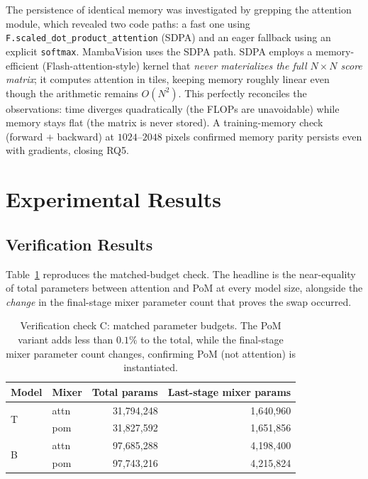\documentclass[11pt,a4paper]{article}
\begin{document}
The persistence of identical memory was investigated by grepping the attention module, which revealed two code paths: a fast one using \texttt{F.scaled\_dot\_product\_attention} (SDPA) and an eager fallback using an explicit \texttt{softmax}. MambaVision uses the SDPA path. SDPA employs a memory-efficient (Flash-attention-style) kernel that \emph{never materializes the full $N\times N$ score matrix}; it computes attention in tiles, keeping memory roughly linear even though the arithmetic remains $O(N^2)$. This perfectly reconciles the observations: time diverges quadratically (the FLOPs are unavoidable) while memory stays flat (the matrix is never stored). A training-memory check (forward $+$ backward) at $1024$--$2048$ pixels confirmed memory parity persists even with gradients, closing RQ5.

\section{Experimental Results}
\label{sec:results}

\subsection{Verification Results}

Table~\ref{tab:verify} reproduces the matched-budget check. The headline is the near-equality of total parameters between attention and PoM at every model size, alongside the \emph{change} in the final-stage mixer parameter count that proves the swap occurred.

\begin{table}[H]
\centering
\caption{Verification check C: matched parameter budgets. The PoM variant adds less than $0.1\%$ to the total, while the final-stage mixer parameter count changes, confirming PoM (not attention) is instantiated.}
\label{tab:verify}
\small
\begin{tabular}{l l r r}
\toprule
\textbf{Model} & \textbf{Mixer} & \textbf{Total params} & \textbf{Last-stage mixer params} \\
\midrule
\multirow{2}{*}{T} & attn & 31{,}794{,}248 & 1{,}640{,}960 \\
                   & pom  & 31{,}827{,}592 & 1{,}651{,}856 \\
\midrule
\multirow{2}{*}{B} & attn & 97{,}685{,}288 & 4{,}198{,}400 \\
                   & pom  & 97{,}743{,}216 & 4{,}215{,}824 \\
\bottomrule
\end{tabular}
\end{table}
\end{document}
